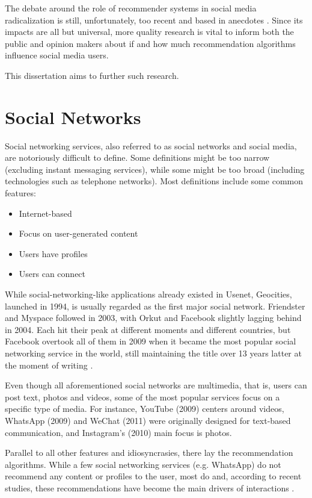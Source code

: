 The debate around the role of recommender systems in social media radicalization
is still, unfortunately, too recent and based in anecdotes \citep{}. Since its
impacts are all but universal, more quality research is vital to inform both the
public and opinion makers about if and how much recommendation algorithms
influence social media users.

This dissertation aims to further such research.

\section{Social Networks}
\label{sec:social_networks}

Social networking services, also referred to as social networks and social
media, are notoriously difficult to define. Some definitions might be too narrow
(excluding instant messaging services), while some might be too broad (including
technologies such as telephone networks). Most definitions \citep{} include some
common features:

\begin{itemize}
  \item Internet-based
  \item Focus on user-generated content
  \item Users have profiles
  \item Users can connect
\end{itemize}

While social-networking-like applications already existed in Usenet, Geocities,
launched in 1994, is usually regarded as the first major social network.
Friendster and Myspace followed in 2003, with Orkut and Facebook slightly
lagging behind in 2004. Each hit their peak at different moments and different
countries, but Facebook overtook all of them in 2009 when it became the most
popular social networking service in the world, still maintaining the title over
13 years latter at the moment of writing \citep{}.

Even though all aforementioned social networks are multimedia, that is, users
can post text, photos and videos, some of the most popular services focus on a
specific type of media. For instance, YouTube (2009) centers around videos,
WhatsApp (2009) and WeChat (2011) were originally designed for text-based
communication, and Instagram's (2010) main focus is photos.

Parallel to all other features and idiosyncrasies, there lay the recommendation
algorithms. While a few social networking services (e.g. WhatsApp) do not
recommend any content or profiles to the user, most do and, according to recent
studies, these recommendations have become the main drivers of interactions
\citep{}.

